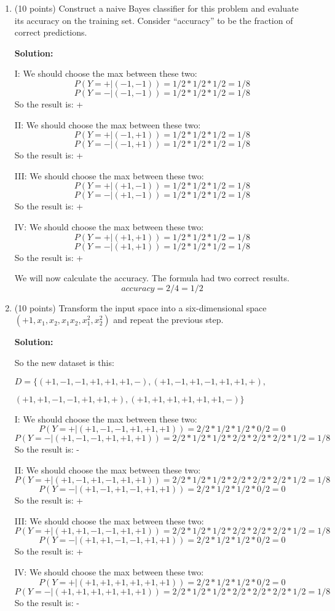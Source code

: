 \documentclass[twoside]{article}
\begin{document}
\begin{enumerate}
\item (10 points) Construct a naive Bayes classifier for this problem and evaluate its accuracy on the training set. Consider ``accuracy'' to be the fraction of correct predictions.

\textbf{Solution:}

I: We should choose the max between these two:
\[
P(Y=+|(-1,-1)) = 1/2 * 1/2 * 1/2 = 1/8
\]
\[
P(Y=-|(-1,-1)) = 1/2 * 1/2 * 1/2 = 1/8
\]
So the result is: +

II: We should choose the max between these two:
\[
P(Y=+|(-1,+1)) = 1/2 * 1/2 * 1/2 = 1/8
\]
\[
P(Y=-|(-1,+1)) = 1/2 * 1/2 * 1/2 = 1/8
\]
So the result is: +

III: We should choose the max between these two:
\[
P(Y=+|(+1,-1)) = 1/2 * 1/2 * 1/2 = 1/8
\]
\[
P(Y=-|(+1,-1)) = 1/2 * 1/2 * 1/2 = 1/8
\]
So the result is: +

IV: We should choose the max between these two:
\[
P(Y=+|(+1,+1)) = 1/2 * 1/2 * 1/2 = 1/8
\]
\[
P(Y=-|(+1,+1)) = 1/2 * 1/2 * 1/2 = 1/8
\]
So the result is: +

We will now calculate the accuracy. The formula had two correct results.
\[
accuracy  = 2 / 4 = 1/2
\]

\item (10 points) Transform the input space into a six-dimensional space $(+1, x_{1}, x_{2}, x_{1}x_{2}, x_{1}^{2}, x_{2}^{2})$ and repeat the previous step.

\textbf{Solution:}

So the new dataset is this:

$D = \{
(+1,-1,-1,+1,+1,+1,-),
(+1,-1,+1,-1,+1,+1,+),
$

$
(+1,+1,-1,-1,+1,+1,+),
(+1,+1,+1,+1,+1,+1,-)
\}
$

I: We should choose the max between these two:
\[
P(Y=+|(+1,-1,-1,+1,+1,+1)) = 2/2 * 1/2 * 1/2 * 0/2 = 0
\]
\[
P(Y=-|(+1,-1,-1,+1,+1,+1)) = 2/2*1/2*1/2*2/2*2/2*2/2 *1/2 = 1/8
\]
So the result is: -

II: We should choose the max between these two:
\[
P(Y=+|(+1,-1,+1,-1,+1,+1)) = 2/2*1/2*1/2*2/2*2/2*2/2 *1/2 = 1/8
\]
\[
P(Y=-|(+1,-1,+1,-1,+1,+1)) = 2/2 * 1/2 * 1/2 * 0/2 = 0
\]
So the result is: +

III: We should choose the max between these two:
\[
P(Y=+|(+1,+1,-1,-1,+1,+1)) = 2/2*1/2*1/2*2/2*2/2*2/2 *1/2 = 1/8
\]
\[
P(Y=-|(+1,+1,-1,-1,+1,+1)) = 2/2 * 1/2 * 1/2 * 0/2 = 0
\]
So the result is: +

IV: We should choose the max between these two:
\[
P(Y=+|(+1,+1,+1,+1,+1,+1)) = 2/2 * 1/2 * 1/2 * 0/2 = 0
\]
\[
P(Y=-|(+1,+1,+1,+1,+1,+1)) = 2/2*1/2*1/2*2/2*2/2*2/2 *1/2 = 1/8
\]
So the result is: -


\end{enumerate}
\end{document}
